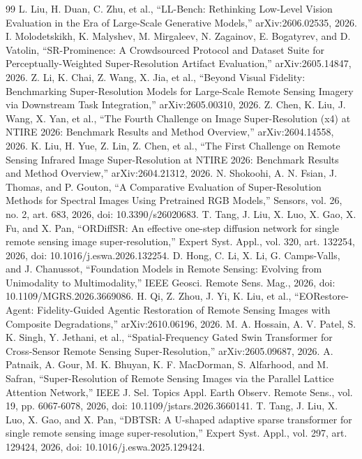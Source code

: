 \documentclass[journal,twoside,10pt]{IEEEtran}
\begin{document}
\begin{thebibliography}{99}
L. Liu, H. Duan, C. Zhu, et al., ``LL-Bench: Rethinking Low-Level Vision Evaluation in the Era of Large-Scale Generative Models,'' arXiv:2606.02535, 2026.
I. Molodetskikh, K. Malyshev, M. Mirgaleev, N. Zagainov, E. Bogatyrev, and D. Vatolin, ``SR-Prominence: A Crowdsourced Protocol and Dataset Suite for Perceptually-Weighted Super-Resolution Artifact Evaluation,'' arXiv:2605.14847, 2026.
Z. Li, K. Chai, Z. Wang, X. Jia, et al., ``Beyond Visual Fidelity: Benchmarking Super-Resolution Models for Large-Scale Remote Sensing Imagery via Downstream Task Integration,'' arXiv:2605.00310, 2026.
Z. Chen, K. Liu, J. Wang, X. Yan, et al., ``The Fourth Challenge on Image Super-Resolution (x4) at NTIRE 2026: Benchmark Results and Method Overview,'' arXiv:2604.14558, 2026.
K. Liu, H. Yue, Z. Lin, Z. Chen, et al., ``The First Challenge on Remote Sensing Infrared Image Super-Resolution at NTIRE 2026: Benchmark Results and Method Overview,'' arXiv:2604.21312, 2026.
N. Shokoohi, A. N. Fsian, J. Thomas, and P. Gouton, ``A Comparative Evaluation of Super-Resolution Methods for Spectral Images Using Pretrained RGB Models,'' Sensors, vol. 26, no. 2, art. 683, 2026, doi: 10.3390/s26020683.
T. Tang, J. Liu, X. Luo, X. Gao, X. Fu, and X. Pan, ``ORDiffSR: An effective one-step diffusion network for single remote sensing image super-resolution,'' Expert Syst. Appl., vol. 320, art. 132254, 2026, doi: 10.1016/j.eswa.2026.132254.
D. Hong, C. Li, X. Li, G. Camps-Valls, and J. Chanussot, ``Foundation Models in Remote Sensing: Evolving from Unimodality to Multimodality,'' IEEE Geosci. Remote Sens. Mag., 2026, doi: 10.1109/MGRS.2026.3669086.
H. Qi, Z. Zhou, J. Yi, K. Liu, et al., ``EORestore-Agent: Fidelity-Guided Agentic Restoration of Remote Sensing Images with Composite Degradations,'' arXiv:2610.06196, 2026.
M. A. Hossain, A. V. Patel, S. K. Singh, Y. Jethani, et al., ``Spatial-Frequency Gated Swin Transformer for Cross-Sensor Remote Sensing Super-Resolution,'' arXiv:2605.09687, 2026.
A. Patnaik, A. Gour, M. K. Bhuyan, K. F. MacDorman, S. Alfarhood, and M. Safran, ``Super-Resolution of Remote Sensing Images via the Parallel Lattice Attention Network,'' IEEE J. Sel. Topics Appl. Earth Observ. Remote Sens., vol. 19, pp. 6067-6078, 2026, doi: 10.1109/jstars.2026.3660141.
T. Tang, J. Liu, X. Luo, X. Gao, and X. Pan, ``DBTSR: A U-shaped adaptive sparse transformer for single remote sensing image super-resolution,'' Expert Syst. Appl., vol. 297, art. 129424, 2026, doi: 10.1016/j.eswa.2025.129424.

\end{thebibliography}
\end{document}
